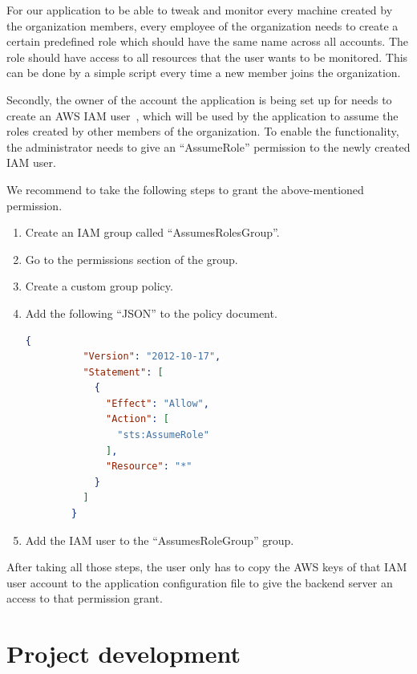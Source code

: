 \documentclass[licencjacka,en]{thesisclass}
\begin{document}
    For our application to be able to tweak and monitor every machine
    created by the organization members, every employee of the organization
    needs to create a certain predefined role
    which should have the same name across all accounts.
    The role should have access to all resources that the user wants to be monitored.
    This can be done by a simple script every time a new member joins the organization.

    Secondly, the owner of the account the application is being set up for
    needs to create an AWS IAM user~\cite{AWSIAM},
    which will be used by the application to assume
    the roles created by other members of the organization.
    To enable the functionality, the administrator needs
    to give an “AssumeRole” permission to the newly created IAM user.

    We recommend to take the following steps to grant the above-mentioned permission.


    \begin{enumerate}
        \item Create an IAM group called “AssumesRolesGroup”.
        \item Go to the permissions section of the group.
        \item Create a custom group policy.
        \item Add the following “JSON” to the policy document.

        \begin{lstlisting}[language=json,firstnumber=1]
        {
          "Version": "2012-10-17",
          "Statement": [
            {
              "Effect": "Allow",
              "Action": [
                "sts:AssumeRole"
              ],
              "Resource": "*"
            }
          ]
        }
        \end{lstlisting}

        \item Add the IAM user to the “AssumesRoleGroup” group.
    \end{enumerate}

    After taking all those steps, the user only has to copy
    the AWS keys of that IAM user account
    to the application configuration file to give the backend server
    an access to that permission grant.

    \chapter{Project development}
\end{document}
